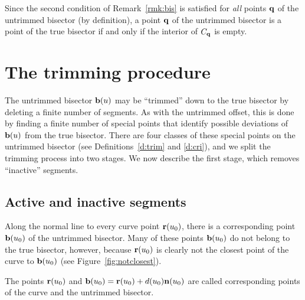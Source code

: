 Since the second condition of Remark~\ref{rmk:bis} is satisfied for
{\it all\/} points ${\bf q}$ of the untrimmed bisector (by definition),
a point ${\bf q}$ of the untrimmed bisector is a point of the true
bisector if and only if the interior of $C_{\bf q}$ is empty.

\section{The trimming procedure}
\label{trimming}

The untrimmed bisector ${\bf b}(u)$ may be ``trimmed'' down to the true
bisector by deleting a finite number of segments. As with the untrimmed
offset, this is done by finding a finite number of special points that
identify possible deviations of ${\bf b}(u)$ from the true bisector.
There are four classes of these special points on the untrimmed bisector
(see Definitions~\ref{d:trim} and \ref{d:cri}), and we split the trimming
process into two stages. We now describe the first stage, which removes
``inactive'' segments.

\subsection{Active and inactive segments}

Along the normal line to every curve point ${\bf r}(u_0)$, there is a
corresponding point ${\bf b}(u_0)$ of the untrimmed bisector. Many of
these points ${\bf b}(u_0)$ do not belong to the true bisector, however,
because ${\bf r}(u_0)$ is clearly not the closest point of the curve to
${\bf b}(u_0)$ (see Figure~\ref{fig:notclosest}).


\begin{dfn}
The points ${\bf r}(u_0)$ and ${\bf b}(u_0)={\bf r}(u_0)+d(u_0){\bf n}
(u_0)$ are called {\rm corresponding} points of the curve and the
untrimmed bisector.
\end{dfn}

